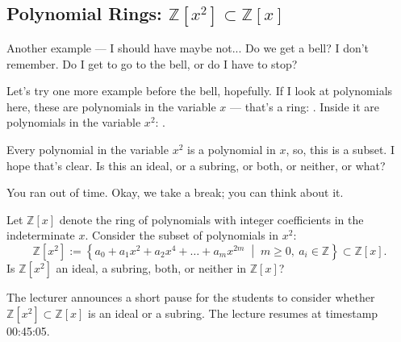 \begin{hidden}
\end{hidden}

\subsection{Polynomial Rings: \texorpdfstring{$\mathbb{Z}[x^2] \subset \mathbb{Z}[x]$}{Z[x\texttwosuperior] in Z[x]}}

\begin{speech}[00:44:07 - 00:45:04]
Another example --- I should have maybe not... Do we get a bell? I don't remember. Do I get to go to the bell, or do I have to stop?

Let's try one more example before the bell, hopefully. If I look at polynomials here, these are polynomials in the variable $x$ --- that's a ring: . Inside it are polynomials in the variable $x^2$: .

Every polynomial in the variable $x^2$ is a polynomial in $x$, so, this is a subset. I hope that's clear. Is this an ideal, or a subring, or both, or neither, or what?

You ran out of time. Okay, we take a break; you can think about it.
\end{speech}

\begin{content}
\begin{question}
Let $\mathbb{Z}[x]$ denote the ring of polynomials with integer coefficients in the indeterminate $x$. Consider the subset of polynomials in $x^2$:
\[
\mathbb{Z}[x^2] := \left\{ a_0 + a_1 x^2 + a_2 x^4 + \dots + a_m x^{2m} \;\middle|\; m \ge 0, \ a_i \in \mathbb{Z} \right\} \subset \mathbb{Z}[x].
\]
Is $\mathbb{Z}[x^2]$ an ideal, a subring, both, or neither in $\mathbb{Z}[x]$?
\end{question}
\end{content}

\begin{pause}
The lecturer announces a short pause for the students to consider whether $\mathbb{Z}[x^2] \subset \mathbb{Z}[x]$ is an ideal or a subring. The lecture resumes at timestamp 00:45:05.
\end{pause}

